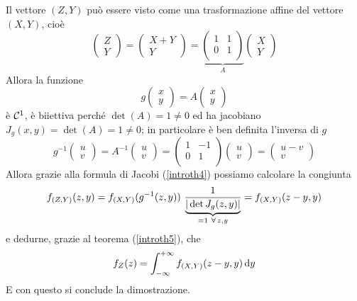 \begin{enumerate}
Il vettore $(Z,Y)$ può essere visto come una trasformazione affine del vettore $(X,Y)$, cioè
\[
\begin{pmatrix}
Z \\ Y
\end{pmatrix} =\begin{pmatrix}
X+Y \\ Y
\end{pmatrix} = \underbrace{\begin{pmatrix}
1 & 1 \\
0 &  1\\
\end{pmatrix}}_{A}\begin{pmatrix}
X \\ Y
\end{pmatrix}
\]
Allora la funzione
\[
g\begin{pmatrix}
x \\ y
\end{pmatrix}=A\begin{pmatrix}
x \\ y
\end{pmatrix}
\]
è $\mathcal{C}^1$, è biiettiva perché $\det(A)=1\neq0$ ed ha jacobiano $J_g(x,y)=\det(A)=1\neq0$; in particolare è ben definita l'inversa di $g$
\[
g^{-1}\begin{pmatrix}
u \\ v
\end{pmatrix} =A^{-1}\begin{pmatrix}
u \\ v
\end{pmatrix} = \begin{pmatrix}
1 & -1 \\
0 &  1\\
\end{pmatrix}\begin{pmatrix}
u \\ v
\end{pmatrix}=\begin{pmatrix}
u-v \\ v
\end{pmatrix}
\]
Allora grazie alla formula di Jacobi (\ref{introth4}) possiamo calcolare la congiunta
\[
f_{(Z,Y)}(z,y)=\fXY(g^{-1}(z,y))\ \frac{1}{\underbrace{|\det J_g(z,y)|}_{=1\ \forall z,y}}=\fXY(z-y,y)
\]
e dedurne, grazie al teorema (\ref{introth5}), che
\[
f_Z(z)=\int_{-\infty}^{+\infty} f_{(X,Y)}(z-y,y)\, \mathrm{d} y
\]
E con questo si conclude la dimostrazione.
\end{enumerate}

